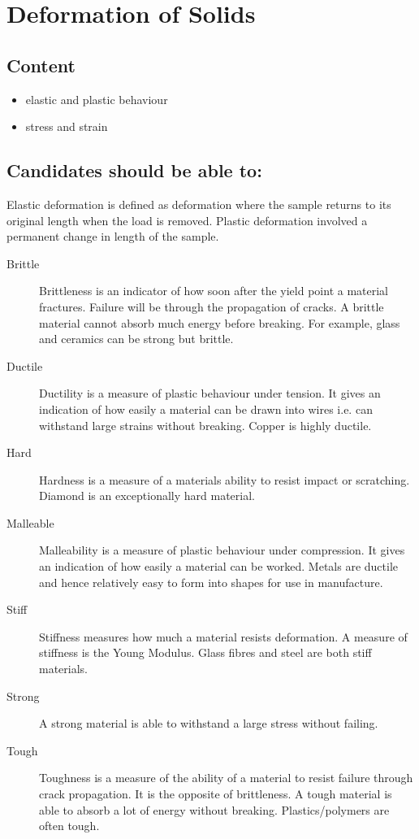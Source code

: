\documentclass[revision-guide.tex]{subfiles}
\begin{document}
\chapter{Deformation of Solids}
\section*{Content}
\begin{itemize}
\item elastic and plastic behaviour
\item stress and strain
\end{itemize}

\section*{Candidates should be able to:}

Elastic deformation is defined as deformation where the sample returns to its original length when the load is removed. Plastic deformation involved a permanent change in length of the sample.


\begin{description}
    \item[Brittle] Brittleness is an indicator of how soon after the yield point a material fractures. Failure will be through the propagation of cracks. A brittle material cannot absorb much energy before breaking. For example, glass and ceramics can be strong but brittle.
    \item[Ductile] Ductility is a measure of plastic behaviour under tension. It gives an indication of how easily a material can be drawn into wires i.e. can withstand large strains without breaking. Copper is highly ductile.
    \item[Hard] Hardness is a measure of a materials ability to resist impact or scratching. Diamond is an exceptionally hard material.
    \item[Malleable] Malleability is a measure of plastic behaviour under compression. It gives an indication of how easily a material can be worked. Metals are ductile and hence relatively easy to form into shapes for use in manufacture.
    \item[Stiff] Stiffness measures how much a material resists deformation. A measure of stiffness is the Young Modulus. Glass fibres and steel are both stiff materials.
    \item[Strong] A strong material is able to withstand a large stress without failing.
    \item[Tough] Toughness is a measure of the ability of a material to resist failure through crack propagation. It is the opposite of brittleness. A tough material is able to absorb a lot of energy without breaking. Plastics/polymers are often tough.
\end{description}
\end{document}
